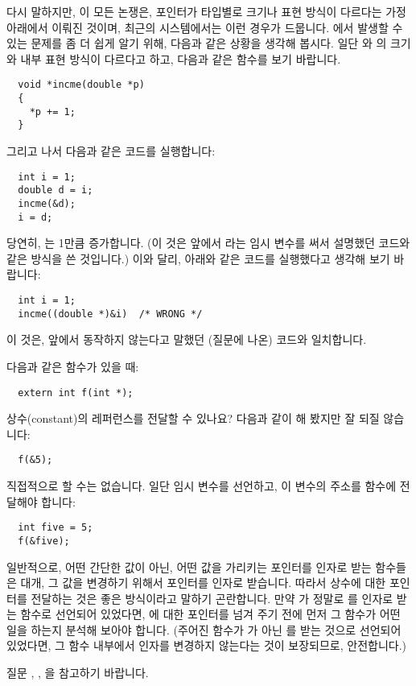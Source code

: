 \begin{faq}
        다시 말하지만, 이 모든 논쟁은, 포인터가 타입별로 크기나 표현 방식이 다르다는 가정 아래에서
        이뤄진 것이며, 최근의 시스템에서는 이런 경우가 드뭅니다. 에서 발생할 수
        있는 문제를 좀 더 쉽게 알기 위해, 다음과 같은 상황을 생각해 봅시다. 일단 와
        의 크기와 내부 표현 방식이 다르다고 하고, 다음과 같은 함수를 보기 바랍니다.
\begin{verbatim}
  void *incme(double *p)
  {
    *p += 1;
  }
\end{verbatim}
        그리고 나서 다음과 같은 코드를 실행합니다:
\begin{verbatim}
  int i = 1;
  double d = i;
  incme(&d);
  i = d;
\end{verbatim}
        당연히, 는 1만큼 증가합니다. (이 것은 앞에서 라는 임시 변수를 써서
        설명했던  코드와 같은 방식을 쓴 것입니다.) 이와 달리, 아래와 같은 코드를
        실행했다고 생각해 보기 바랍니다:
\begin{verbatim}
  int i = 1;
  incme((double *)&i)  /* WRONG */
\end{verbatim}
        이 것은, 앞에서 동작하지 않는다고 말했던 (질문에 나온) 코드와 일치합니다.
\end{faq}

\begin{faq}
	다음과 같은 함수가 있을 때:

\begin{verbatim}
  extern int f(int *);
\end{verbatim}

	\noindent 상수(constant)의 레퍼런스를 전달할 수 있나요? 다음과 같이
	해 봤지만 잘 되질 않습니다:

\begin{verbatim}
  f(&5);
\end{verbatim}

\A
	직접적으로 할 수는 없습니다.  일단 임시 변수를 선언하고, 이 변수의
	주소를 함수에 전달해야 합니다:

\begin{verbatim}
  int five = 5;
  f(&five);
\end{verbatim}
        일반적으로, 어떤 간단한 값이 아닌, 어떤 값을 가리키는 포인터를 인자로 받는 함수들은
        대개, 그 값을 변경하기 위해서 포인터를 인자로 받습니다. 따라서 상수에 대한 포인터를
        전달하는 것은 좋은 방식이라고 말하기 곤란합니다. 만약 가 정말로 를
        인자로 받는 함수로 선언되어 있었다면, 에 대한 포인터를 넘겨 주기 전에
        먼저 그 함수가 어떤 일을 하는지 분석해 보아야 합니다. (주어진 함수가 가 아닌
        를 받는 것으로 선언되어 있었다면, 그 함수 내부에서 인자를 변경하지
        않는다는 것이 보장되므로, 안전합니다.)

	\noindent 질문 , , 을 참고하기 바랍니다.
\end{faq}

